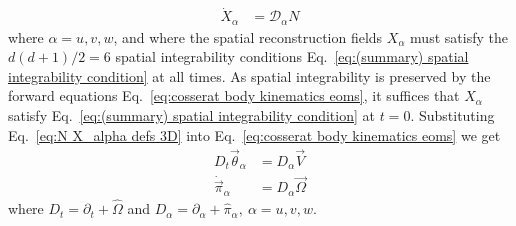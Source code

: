 \begin{subequations} \label{eq:cosserat body kinematics eoms}
\begin{align}
\dot{X}_\alpha & = \mathcal{D}_\alpha N
\end{align}
\end{subequations}
where $\alpha = u,v,w$, and where the spatial reconstruction fields $X_\alpha$ must satisfy the $d(d+1)/2 = 6$ spatial integrability conditions Eq.~\ref{eq:(summary) spatial integrability condition} at all times. As spatial integrability is preserved by the forward equations Eq.~\ref{eq:cosserat body kinematics eoms}, it suffices that $X_\alpha$ satisfy Eq.~\ref{eq:(summary) spatial integrability condition} at $t=0$. Substituting Eq.~\ref{eq:N X_alpha defs 3D} into Eq.~\ref{eq:cosserat body kinematics eoms} we get
\begin{subequations} \label{eq:cosserat body kinematics eoms 2}
\begin{align}
D_t \vec{\theta}_\alpha & = D_\alpha \vec{V} \\
\dot{\vec{\pi}}_\alpha & = D_\alpha \vec{\Omega}
\end{align}
\end{subequations}
where $D_t = \partial_t + \hat{\Omega}$ and $D_\alpha = \partial_\alpha + \hat{\pi}_\alpha,\ \alpha = u,v,w$.

